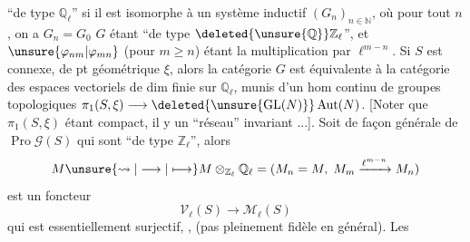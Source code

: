``de type $\mathbb Q_\ell$'' si il est isomorphe à un  système inductif $(G_n)_{n\in\mathbb N}$, où pour tout $n$, on a $G_n=G_0$ $G$ étant ``de type $\deleted{\unsure{\mathbb Q}}\mathbb Z_\ell$'', et $\unsure{\varphi_{nm}|\varphi_{mn}}$ (pour $m\geq n$) étant la multiplication par $\ell^{m-n}$. Si $S$ est connexe, de pt géométrique $\xi$, alors la catégorie   $G$ est équivalente à la catégorie des espaces vectoriels  de dim finie sur $\mathbb Q_\ell$, munis d'un hom continu de groupes topologiques $\pi_1(S,\xi)\longrightarrow\deleted{\unsure{\operatorname{GL}(N)}}\operatorname{Aut}(N)$. [Noter que $\pi_1(S,\xi)$ étant compact, il y  un ``réseau'' invariant ...]. Soit de façon générale   de $\operatorname{Pro}\mathscr G(S)$ qui sont ``de type $\mathbb Z_\ell$'', alors 
\[
M\unsure{\rightsquigarrow|\longrightarrow|\longmapsto}M\otimes_{\mathbb Z_\ell}\mathbb Q_\ell=(M_n=M,\;M_m\xrightarrow{\ell^{m-n}}M_n)
\]
est un foncteur
\[
\mathcal V_\ell(S)\longrightarrow\mathcal M_\ell(S)
\]
qui est essentiellement surjectif, , (pas pleinement fidèle en général). Les

